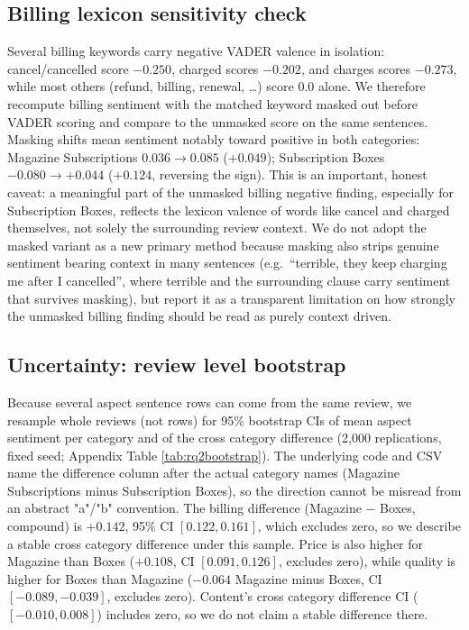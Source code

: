 \documentclass[11pt,a4paper,DIV=12]{scrartcl}
\begin{document}
\subsection{Billing lexicon sensitivity check}
\label{sec:rq2-lexicon-check}
Several billing keywords carry negative VADER valence in isolation:
cancel/cancelled score $-0.250$, charged scores $-0.202$,
and charges scores $-0.273$, while most others (refund,
billing, renewal, \ldots) score $0.0$ alone. We therefore recompute billing
sentiment with the matched keyword masked out before VADER scoring and compare
to the unmasked score on the same sentences. Masking shifts mean sentiment
notably toward positive in both categories: Magazine Subscriptions
$0.036\rightarrow0.085$ ($+0.049$); Subscription Boxes
$-0.080\rightarrow+0.044$ ($+0.124$, reversing the sign). This is an
important, honest caveat: a meaningful part of the unmasked billing negative
finding, especially for Subscription Boxes, reflects the lexicon valence of
words like cancel and charged themselves, not solely the
surrounding review context. We do not adopt the masked variant as a new
primary method because masking also strips genuine sentiment bearing context in
many sentences (e.g.\ ``terrible, they keep charging me after I
cancelled'', where terrible and the surrounding clause carry sentiment
that survives masking), but report it as a transparent limitation on how
strongly the unmasked billing finding should be read as purely
context driven.

\subsection{Uncertainty: review level bootstrap}
\label{sec:rq2-uncertainty}
Because several aspect sentence rows can come from the same review, we
resample whole reviews (not rows) for 95\% bootstrap CIs of mean aspect
sentiment per category and of the cross category difference (2,000
replications, fixed seed; Appendix Table \ref{tab:rq2bootstrap}). The underlying code
and CSV name the difference column after the actual category names (Magazine
Subscriptions minus Subscription Boxes), so the direction cannot be misread
from an abstract "a"/"b" convention. The billing
difference (Magazine $-$ Boxes, compound) is $+0.142$, 95\% CI $[0.122, 0.161]$,
which excludes zero, so we describe a stable cross category difference under
this sample. Price is also higher for Magazine than Boxes ($+0.108$, CI
$[0.091, 0.126]$, excludes zero), while quality is higher for Boxes than
Magazine ($-0.064$ Magazine minus Boxes, CI $[-0.089, -0.039]$, excludes
zero). Content's cross category difference CI ($[-0.010, 0.008]$)
includes zero, so we do not claim a stable difference there.
\end{document}
